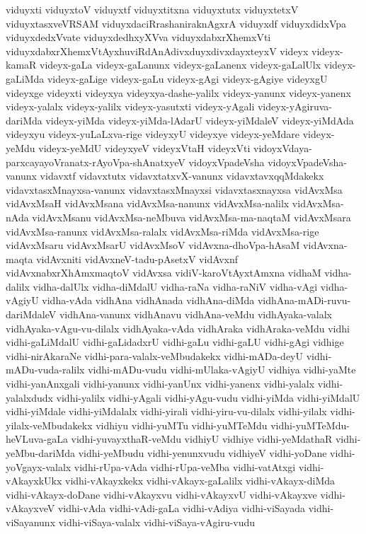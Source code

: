 {viduyxti
viduyxtoV
viduyxtf
viduyxtitxna
viduyxtutx
viduyxtetxV
viduyxtasxveVRSAM
viduyxdaciRrashaniraknAgxrA
viduyxdf
viduyxdidxVpa
viduyxdedxVvate
viduyxdedhxyXVva
viduyxdabxrXhemxVti
viduyxdabxrXhemxVtAyxhuviRdAnAdivxduyxdivxdayxteyxV
videyx
videyx-kamaR
videyx-gaLa
videyx-gaLanunx
videyx-gaLanenx
videyx-gaLalUlx
videyx-gaLiMda
videyx-gaLige
videyx-gaLu
videyx-gAgi
videyx-gAgiye
videyxgU
videyxge
videyxti
videyxya
videyxya-dashe-yalilx
videyx-yanunx
videyx-yanenx
videyx-yalalx
videyx-yalilx
videyx-yasutxti
videyx-yAgali
videyx-yAgiruva-dariMda
videyx-yiMda
videyx-yiMda-lAdarU
videyx-yiMdaleV
videyx-yiMdAda
videyxyu
videyx-yuLaLxva-rige
videyxyU
videyxye
videyx-yeMdare
videyx-yeMdu
videyx-yeMdU
videyxyeV
videyxVtaH
videyxVti
vidoyxVdaya-parxcayayoVranatx-rAyoVpa-shAnatxyeV
vidoyxVpadeVsha
vidoyxVpadeVsha-vanunx
vidavxtf
vidavxtutx
vidavxtatxvX-vanunx
vidavxtavxqqMdakekx
vidavxtasxMnayxsa-vanunx
vidavxtasxMnayxsi
vidavxtasxnayxsa
vidAvxMsa
vidAvxMsaH
vidAvxMsana
vidAvxMsa-nanunx
vidAvxMsa-nalilx
vidAvxMsa-nAda
vidAvxMsanu
vidAvxMsa-neMbuva
vidAvxMsa-ma-naqtaM
vidAvxMsara
vidAvxMsa-ranunx
vidAvxMsa-ralalx
vidAvxMsa-riMda
vidAvxMsa-rige
vidAvxMsaru
vidAvxMsarU
vidAvxMsoV
vidAvxna-dhoVpa-hAsaM
vidAvxna-maqta
vidAvxniti
vidAvxneV-tadu-pAsetxV
vidAvxnf
vidAvxnabxrXhAmxmaqtoV
vidAvxsa
vidiV-karoVtAyxtAmxna
vidhaM
vidha-dalilx
vidha-dalUlx
vidha-diMdalU
vidha-raNa
vidha-raNiV
vidha-vAgi
vidha-vAgiyU
vidha-vAda
vidhAna
vidhAnada
vidhAna-diMda
vidhAna-mADi-ruvu-dariMdaleV
vidhAna-vanunx
vidhAnavu
vidhAna-veMdu
vidhAyaka-valalx
vidhAyaka-vAgu-vu-dilalx
vidhAyaka-vAda
vidhAraka
vidhAraka-veMdu
vidhi
vidhi-gaLiMdalU
vidhi-gaLidadxrU
vidhi-gaLu
vidhi-gaLU
vidhi-gAgi
vidhige
vidhi-nirAkaraNe
vidhi-para-valalx-veMbudakekx
vidhi-mADa-deyU
vidhi-mADu-vuda-ralilx
vidhi-mADu-vudu
vidhi-mUlaka-vAgiyU
vidhiya
vidhi-yaMte
vidhi-yanAnxgali
vidhi-yanunx
vidhi-yanUnx
vidhi-yanenx
vidhi-yalalx
vidhi-yalalxdudx
vidhi-yalilx
vidhi-yAgali
vidhi-yAgu-vudu
vidhi-yiMda
vidhi-yiMdalU
vidhi-yiMdale
vidhi-yiMdalalx
vidhi-yirali
vidhi-yiru-vu-dilalx
vidhi-yilalx
vidhi-yilalx-veMbudakekx
vidhiyu
vidhi-yuMTu
vidhi-yuMTeMdu
vidhi-yuMTeMdu-heVLuva-gaLa
vidhi-yuvayxthaR-veMdu
vidhiyU
vidhiye
vidhi-yeMdathaR
vidhi-yeMbu-dariMda
vidhi-yeMbudu
vidhi-yenunxvudu
vidhiyeV
vidhi-yoDane
vidhi-yoVgayx-valalx
vidhi-rUpa-vAda
vidhi-rUpa-veMba
vidhi-vatAtxgi
vidhi-vAkayxkUkx
vidhi-vAkayxkekx
vidhi-vAkayx-gaLalilx
vidhi-vAkayx-diMda
vidhi-vAkayx-doDane
vidhi-vAkayxvu
vidhi-vAkayxvU
vidhi-vAkayxve
vidhi-vAkayxveV
vidhi-vAda
vidhi-vAdi-gaLa
vidhi-vAdiya
vidhi-viSayada
vidhi-viSayanunx
vidhi-viSaya-valalx
vidhi-viSaya-vAgiru-vudu
}
